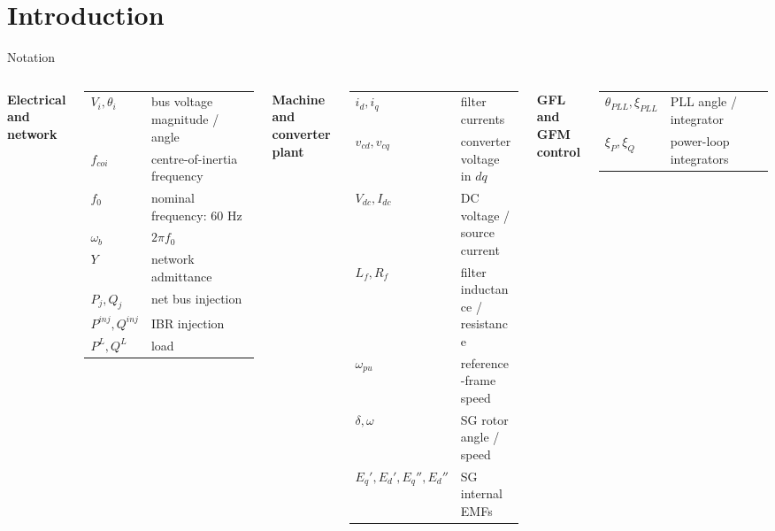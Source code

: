\documentclass{beamer}
\begin{document}
\section{Introduction}
\begin{frame}{Notation}
\fontsize{7}{8.5}\selectfont
\renewcommand{\arraystretch}{1.08}\setlength{\tabcolsep}{3pt}
\begin{columns}[t,onlytextwidth]
\textbf{Electrical and network}\par\smallskip
\begin{tabular}{@{}p{1.65cm}>{\raggedright\arraybackslash}p{3.25cm}@{}}
$V_i,\theta_i$ & bus voltage magnitude / angle\\
$f_{coi}$ & centre-of-inertia frequency\\
$f_0$ & nominal frequency: 60 Hz\\
$\omega_b$ & $2\pi f_0$\\
$Y$ & network admittance\\
$P_j,Q_j$ & net bus injection\\
$P^{inj},Q^{inj}$ & IBR injection\\
$P^L,Q^L$ & load\\
\end{tabular}\par\medskip
\textbf{Machine and converter plant}\par\smallskip
\begin{tabular}{@{}p{1.65cm}>{\raggedright\arraybackslash}p{3.25cm}@{}}
$i_d,i_q$ & filter currents\\
$v_{cd},v_{cq}$ & converter voltage in $dq$\\
$V_{dc},I_{dc}$ & DC voltage / source current\\
$L_f,R_f$ & filter inductance / resistance\\
$\omega_{pu}$ & reference-frame speed\\
$\delta,\omega$ & SG rotor angle / speed\\
$E_q',E_d',E_q'',E_d''$ & SG internal EMFs\\
\end{tabular}\par\medskip
{}
\textbf{GFL and GFM control}\par\smallskip
\begin{tabular}{@{}p{1.65cm}>{\raggedright\arraybackslash}p{3.25cm}@{}}
$\theta_{PLL},\xi_{PLL}$ & PLL angle / integrator\\
$\xi_P,\xi_Q$ & power-loop integrators\\

\end{tabular}
\end{columns}
\end{frame}
\end{document}
